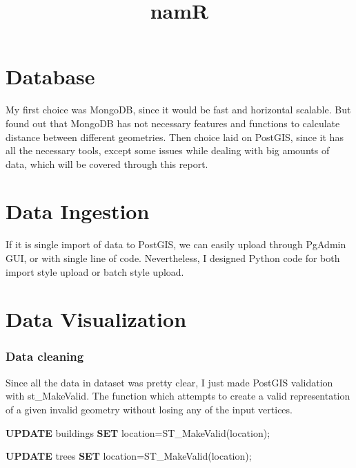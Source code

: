 \documentclass[11pt]{article}
\title{namR}
\newenvironment{Shaded}{}{}
\newcommand{\KeywordTok}[1]{\textcolor[rgb]{0.00,0.44,0.13}{\textbf{{#1}}}}
\newcommand{\NormalTok}[1]{{#1}}
\begin{document}
    
    
    \maketitle
    
    

    
    \hypertarget{database}{%
\section{Database}\label{database}}

    My first choice was MongoDB, since it would be fast and horizontal
scalable. But found out that MongoDB has not necessary features and
functions to calculate distance between different geometries. Then
choice laid on PostGIS, since it has all the necessary tools, except
some issues while dealing with big amounts of data, which will be
covered through this report.

    \hypertarget{data-ingestion}{%
\section{Data Ingestion}\label{data-ingestion}}

    If it is single import of data to PostGIS, we can easily upload through
PgAdmin GUI, or with single line of code. Nevertheless, I designed
Python code for both import style upload or batch style upload.

    \hypertarget{data-visualization}{%
\section{Data Visualization}\label{data-visualization}}

    \hypertarget{data-cleaning}{%
\subsubsection{Data cleaning}\label{data-cleaning}}

Since all the data in dataset was pretty clear, I just made PostGIS
validation with st\_MakeValid. The function which attempts to create a
valid representation of a given invalid geometry without losing any of
the input vertices.

\begin{Shaded}
\begin{Highlighting}[]
\KeywordTok{UPDATE}\NormalTok{ buildings}
\KeywordTok{SET}\NormalTok{ location=ST_MakeValid(location);}

\KeywordTok{UPDATE}\NormalTok{ trees}
\KeywordTok{SET}\NormalTok{ location=ST_MakeValid(location);}
\end{Highlighting}
\end{Shaded}
\end{document}
